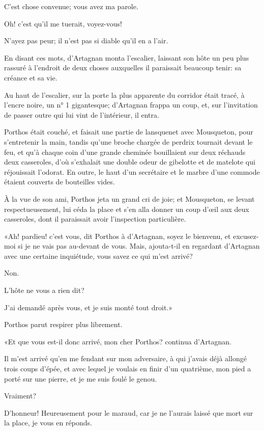 \speak  C'est chose convenue; vous avez ma parole. 

\speak  Oh! c'est qu'il me tuerait, voyez-vous! 

\speak  N'ayez pas peur; il n'est pas si diable qu'il en a l'air. 

En disant ces mots, d'Artagnan monta l'escalier, laissant son hôte un peu plus rassuré à l'endroit de deux choses auxquelles il paraissait beaucoup tenir: sa créance et sa vie. 

Au haut de l'escalier, sur la porte la plus apparente du corridor était tracé, à l'encre noire, un n° 1 gigantesque; d'Artagnan frappa un coup, et, sur l'invitation de passer outre qui lui vint de l'intérieur, il entra. 

Porthos était couché, et faisait une partie de lansquenet avec Mousqueton, pour s'entretenir la main, tandis qu'une broche chargée de perdrix tournait devant le feu, et qu'à chaque coin d'une grande cheminée bouillaient sur deux réchauds deux casseroles, d'où s'exhalait une double odeur de gibelotte et de matelote qui réjouissait l'odorat. En outre, le haut d'un secrétaire et le marbre d'une commode étaient couverts de bouteilles vides. 

À la vue de son ami, Porthos jeta un grand cri de joie; et Mousqueton, se levant respectueusement, lui céda la place et s'en alla donner un coup d'œil aux deux casseroles, dont il paraissait avoir l'inspection particulière. 

«Ah! pardieu! c'est vous, dit Porthos à d'Artagnan, soyez le bienvenu, et excusez-moi si je ne vais pas au-devant de vous. Mais, ajouta-t-il en regardant d'Artagnan avec une certaine inquiétude, vous savez ce qui m'est arrivé? 

\speak  Non. 

\speak  L'hôte ne vous a rien dit? 

\speak  J'ai demandé après vous, et je suis monté tout droit.» 

\speak  Porthos parut respirer plus librement. 

«Et que vous est-il donc arrivé, mon cher Porthos? continua d'Artagnan. 

\speak  Il m'est arrivé qu'en me fendant sur mon adversaire, à qui j'avais déjà allongé trois coups d'épée, et avec lequel je voulais en finir d'un quatrième, mon pied a porté sur une pierre, et je me suis foulé le genou. 

\speak  Vraiment? 

\speak  D'honneur! Heureusement pour le maraud, car je ne l'aurais laissé que mort sur la place, je vous en réponds. 

